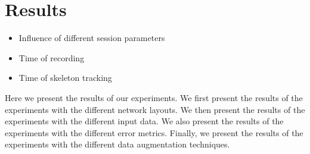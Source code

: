 \chapter{Results}
\label{sec:results}

\begin{itemize}
  \item Influence of different session parameters
  \item Time of recording
  \item Time of skeleton tracking
\end{itemize}

Here we present the results of our experiments. We first present the results of the experiments with the different network layouts. We then present the results of the experiments with the different input data. We also present the results of the experiments with the different error metrics. Finally, we present the results of the experiments with the different data augmentation techniques.